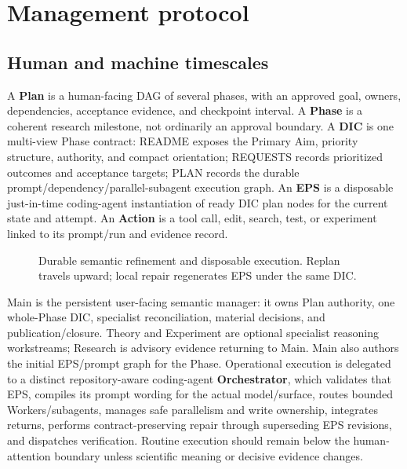 \documentclass{article}
\begin{document}
\section{Management protocol}
\subsection{Human and machine timescales}
A \textbf{Plan} is a human-facing DAG of several phases, with an approved goal, owners, dependencies, acceptance evidence, and checkpoint interval. A \textbf{Phase} is a coherent research milestone, not ordinarily an approval boundary. A \textbf{DIC} is one multi-view Phase contract: README exposes the Primary Aim, priority structure, authority, and compact orientation; REQUESTS records prioritized outcomes and acceptance targets; PLAN records the durable prompt/dependency/parallel-subagent execution graph. An \textbf{EPS} is a disposable just-in-time coding-agent instantiation of ready DIC plan nodes for the current state and attempt. An \textbf{Action} is a tool call, edit, search, test, or experiment linked to its prompt/run and evidence record.

\begin{figure}[t]
\centering
{}
\caption{Durable semantic refinement and disposable execution. Replan travels upward; local repair regenerates EPS under the same DIC.}
\label{fig:hierarchy}
\end{figure}

Main is the persistent user-facing semantic manager: it owns Plan authority, one whole-Phase DIC, specialist reconciliation, material decisions, and publication/closure. Theory and Experiment are optional specialist reasoning workstreams; Research is advisory evidence returning to Main. Main also authors the initial EPS/prompt graph for the Phase. Operational execution is delegated to a distinct repository-aware coding-agent \textbf{Orchestrator}, which validates that EPS, compiles its prompt wording for the actual model/surface, routes bounded Workers/subagents, manages safe parallelism and write ownership, integrates returns, performs contract-preserving repair through superseding EPS revisions, and dispatches verification. Routine execution should remain below the human-attention boundary unless scientific meaning or decisive evidence changes.
\end{document}
